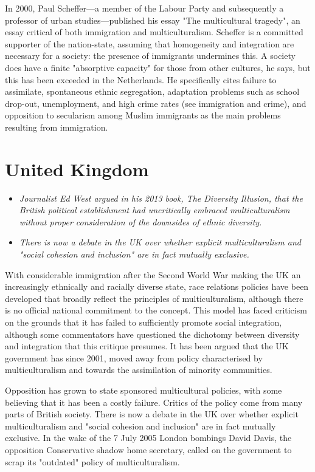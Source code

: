 In 2000, Paul Scheffer---a member of the Labour Party and subsequently a
professor of urban studies---published his essay "The multicultural
tragedy", an essay critical of both immigration and multiculturalism.
Scheffer is a committed supporter of the nation-state, assuming that
homogeneity and integration are necessary for a society: the presence of
immigrants undermines this. A society does have a finite "absorptive
capacity" for those from other cultures, he says, but this has been
exceeded in the Netherlands. He specifically cites failure to
assimilate, spontaneous ethnic segregation, adaptation problems such as
school drop-out, unemployment, and high crime rates (see immigration and
crime), and opposition to secularism among Muslim immigrants as the main
problems resulting from immigration.

\section{United Kingdom}\label{united-kingdom}

\begin{itemize}
\item
  \emph{Journalist Ed West argued in his 2013 book, The Diversity
  Illusion, that the British political establishment had uncritically
  embraced multiculturalism without proper consideration of the
  downsides of ethnic diversity.}
\item
  \emph{There is now a debate in the UK over whether explicit
  multiculturalism and "social cohesion and inclusion" are in fact
  mutually exclusive.}
\end{itemize}

With considerable immigration after the Second World War making the UK
an increasingly ethnically and racially diverse state, race relations
policies have been developed that broadly reflect the principles of
multiculturalism, although there is no official national commitment to
the concept. This model has faced criticism on the grounds that it has
failed to sufficiently promote social integration, although some
commentators have questioned the dichotomy between diversity and
integration that this critique presumes. It has been argued that the UK
government has since 2001, moved away from policy characterised by
multiculturalism and towards the assimilation of minority communities.

Opposition has grown to state sponsored multicultural policies, with
some believing that it has been a costly failure. Critics of the policy
come from many parts of British society. There is now a debate in the UK
over whether explicit multiculturalism and "social cohesion and
inclusion" are in fact mutually exclusive. In the wake of the 7 July
2005 London bombings David Davis, the opposition Conservative shadow
home secretary, called on the government to scrap its "outdated" policy
of multiculturalism.

